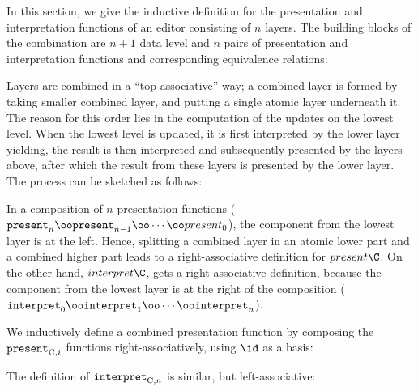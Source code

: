 In this section, we give the inductive definition for the presentation and interpretation functions of an editor consisting of $n$ layers.  The building blocks of the combination are $n+1$ data level and $n$ pairs of presentation and interpretation functions and corresponding equivalence relations:


Layers are combined in a ``top-associative'' way; a combined layer is formed by taking smaller combined layer, and putting a  single atomic layer underneath it. The reason for this order lies in the computation of the updates on the lowest level. When the lowest level is updated, it is first interpreted by the lower layer yielding, the result is then interpreted and subsequently presented by the layers above, after which the result from these layers is presented by the lower layer. The process can be sketched as follows:


In a composition of $n$ presentation functions ($\present_n \oo \present_{n-1} \oo \cdots \oo present_0$), the component from the lowest layer is at the left. Hence, splitting a combined layer in an atomic lower part and a combined higher part leads to a right-associative definition for $present\C$. On the other hand, $interpret\C$, gets a right-associative definition, because the component from the lowest layer is at the right of the composition ($\interpret_0 \oo \interpret_1 \oo \cdots \oo \interpret_n$).

We inductively define a combined presentation function by composing the ${\tt present}_{\mathrm{C},i}$ functions right-associatively, using $\id$ as a basis:


The definition of ${\tt interpret}_{\mathrm{C},n}$ is similar, but left-associative:


